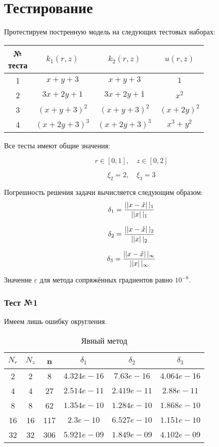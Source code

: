 \section{Тестирование}

Протестируем постренную модель на следующих тестовых наборах:

\begin{center}
  \begin{tabular}{*4{c}}
  \toprule
  \makecell{№ \\ теста} & $k_1(r, z)$ & $k_2(r, z)$ & $ u(r, z)$ \\
  \midrule
  1 & $ x + y + 3 $ & $ x + y + 3 $ & $1$ \\
  2 & $ 3x + 2y + 1 $ & $ 3x + 2y + 1 $ & $x^2$ \\
  3 & $ (x + y + 3)^2 $ & $ (x + y + 3)^2 $ & $(x + 2y)^2$ \\
  4 & $ (x + 2y + 3)^3 $ & $ (x + 2y + 3)^3 $ & $x^3 + y^2$ \\
  \bottomrule
  \end{tabular}
\end{center}

Все тесты имеют общие значения:

\[
  r \in [0, 1],\quad z \in [0, 2]
\]

\[
  \xi_2 = 2,\quad \xi_3 = 3
\]

Погрешность решения задачи вычисляется следующим образом:
\[
\delta_1 = \frac{\left|| x - \Tilde{x} \right||_1 }{\left|| x \right||_1 }
\]

\[
\delta_2 = \frac{\left|| x - \Tilde{x} \right||_2 }{\left|| x \right||_2 }
\]

\[
\delta_3 = \frac{\left|| x - \Tilde{x} \right||_\infty }{\left|| x \right||_\infty }
\]

Значение $ \varepsilon $ для метода сопряжённых градиентов равно $ 10^{-8} $.

\subsubsection*{Тест №1}

Имеем лишь ошибку округления.

\begin{table}[H]
\begin{center}
  \begin{tabular}{*{6}c}
    \toprule
    $ N_r $ & $ N_z $ & n & $ \delta_1 $ & $ \delta_2 $ & $ \delta_3 $ \\
    \midrule
    2 & 2 & 8 & $4.324e-16 $ & $7.63e-16 $ & $4.064e-16 $ \\
    4 & 4 & 27 & $2.514e-11 $ & $2.419e-11 $ & $2.88e-11 $ \\
    8 & 8 & 62 & $1.354e-10 $ & $1.284e-10 $ & $1.868e-10 $ \\
    16 & 16 & 117 & $2.3e-10 $ & $6.527e-10 $ & $1.151e-10 $ \\
    32 & 32 & 306 & $5.921e-09 $ & $1.849e-09 $ & $4.102e-09 $ \\
    \bottomrule
  \end{tabular}
  \caption{Явный метод}
\end{center}
\end{table}

